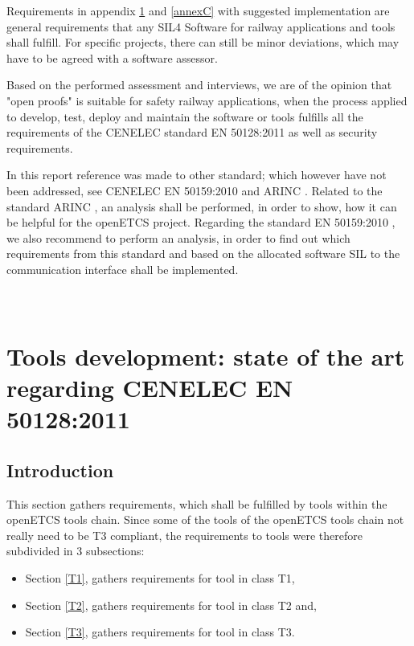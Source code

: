 \documentclass{template/openetcs_report}
\begin{document}
Requirements in appendix \ref{annexA} and \ref{annexC} with suggested implementation are general requirements that any SIL4 Software for railway applications and tools shall fulfill. For specific projects, there can still be minor deviations, which may have to be agreed with a software assessor.

Based on the performed assessment and interviews, we are of the opinion that "open proofs" is suitable for safety railway applications, when the process applied to develop, test, deploy and maintain the software or tools fulfills all the requirements of the CENELEC standard EN 50128:2011 as well as security requirements.

In this report reference was made to other standard; which however have not been addressed, see CENELEC EN 50159:2010 \cite{EN50159} and ARINC \cite{ARINC}.
Related to the standard ARINC \cite{ARINC}, an analysis shall be performed, in order to show, how it can be helpful for the openETCS project. Regarding the standard EN 50159:2010 \cite{EN50159}, we also recommend to perform an analysis, in order to find out which requirements from this standard and based on the allocated software SIL to the communication interface shall be implemented.







\nocite{*}




\appendix

\chapter{\\Tools development: state of the art regarding CENELEC EN 50128:2011}
\label{annexA}

\section{Introduction}
This section gathers requirements, which shall be fulfilled by tools within the openETCS tools chain.
Since some of the tools of the openETCS tools chain not really need to be T3 compliant, the requirements to tools were therefore subdivided in 3 subsections:
\begin{itemize}\itemsep=0pt
  \item Section \ref{T1}, gathers requirements for tool in class T1,
  \item Section \ref{T2}, gathers requirements for tool in class T2 and,
  \item Section \ref{T3}, gathers requirements for tool in class T3.
\end{itemize}
\end{document}
